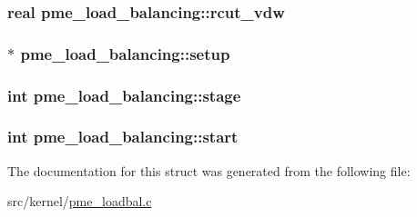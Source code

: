 \hypertarget{structpme__load__balancing_a46b3e51eec7f01c729a6f3033ed5a413}{
\subsubsection[{rcut\-\_\-vdw}]{\setlength{\rightskip}{0pt plus 5cm}real {\bf pme\-\_\-load\-\_\-balancing\-::rcut\-\_\-vdw}}}\label{structpme__load__balancing_a46b3e51eec7f01c729a6f3033ed5a413}
\hypertarget{structpme__load__balancing_a73533de71959d0fdae10ad3f74ff2754}{
\subsubsection[{setup}]{$\ast$ {\bf pme\-\_\-load\-\_\-balancing\-::setup}}}\label{structpme__load__balancing_a73533de71959d0fdae10ad3f74ff2754}
\hypertarget{structpme__load__balancing_a15c9ecc11385e6fc5c2dc0ab26baecd9}{
\subsubsection[{stage}]{\setlength{\rightskip}{0pt plus 5cm}int {\bf pme\-\_\-load\-\_\-balancing\-::stage}}}\label{structpme__load__balancing_a15c9ecc11385e6fc5c2dc0ab26baecd9}
\hypertarget{structpme__load__balancing_a1694f88c362fab71d022d5572c29e280}{
\subsubsection[{start}]{\setlength{\rightskip}{0pt plus 5cm}int {\bf pme\-\_\-load\-\_\-balancing\-::start}}}\label{structpme__load__balancing_a1694f88c362fab71d022d5572c29e280}


\-The documentation for this struct was generated from the following file\-:\begin{DoxyCompactItemize}
\item 
src/kernel/\hyperlink{pme__loadbal_8c}{pme\-\_\-loadbal.\-c}\end{DoxyCompactItemize}
